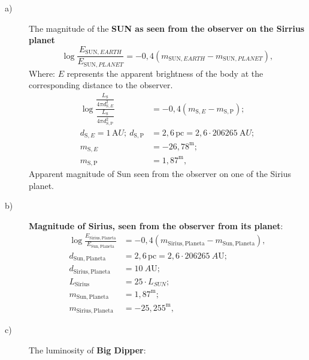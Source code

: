 
\begin{description}
\item[a)] The magnitude of the \textbf{SUN as seen from the observer on the
  Sirrius planet} %
  \[ \log\frac{E_{\mathrm{SUN},EARTH}}{E_{\mathrm{SUN},PLANET}}
     = -0{,}4\left(m_{\mathrm{SUN},EARTH} - m_{\mathrm{SUN},PLANET}\right), \]
  Where: $E$ represents the apparent brightness of the body at the
  corresponding distance to the observer.
  \begin{align*}
  \log\frac{\dfrac{L_{\mathrm{S}}}{4\pi d_{\mathrm{S},E}^2}}
           {\dfrac{L_{\mathrm{S}}}{4\pi d_{\mathrm{S,P}}^2}}
    &= -0{,}4\left(m_{\mathrm{S},E} - m_{\mathrm{S,P}}\right);\\
  d_{\mathrm{S},E} = 1\,\mathrm{A}U;\
  d_{\mathrm{S,P}} &= 2{,}6\,\mathrm{pc}
    = 2{,}6\cdot206265\ \mathrm{A}U;\\
  m_{\mathrm{S},E} &= -26{,}78^{\mathrm{m}};\\
  m_{\mathrm{S,P}} &= 1{,}87^{\mathrm{m}},
  \end{align*}
  Apparent magnitude of Sun seen from the observer on one of the Sirius
  planet.
\item[b)] \textbf{Magnitude of Sirius, seen from the observer from its
  planet}:
  \begin{align*}
  \log\frac{E_{\mathrm{Sirius,Planeta}}}{E_{\mathrm{Sun,Planeta}}}
    &= -0{,}4\left(m_{\mathrm{Sirius,Planeta}}
       - m_{\mathrm{Sun,Planeta}}\right),\\
  d_{\mathrm{Sun,Planeta}} &= 2{,}6\,\mathrm{pc}
    = 2{,}6\cdot206265\ A\mathrm{U};\\
  d_{\mathrm{Sirius,Planeta}} &= 10\ A\mathrm{U};\\
  L_{\mathrm{Sirius}} &= 25\cdot L_{SUN};\\
  m_{\mathrm{Sun,Planeta}} &= 1{,}87^{\mathrm{m}};\\
  m_{\mathrm{Sirius,Planeta}} &= -25{,}255^{\mathrm{m}},
  \end{align*}
\item[c)] The luminosity of \textbf{Big Dipper}:

\end{description}
